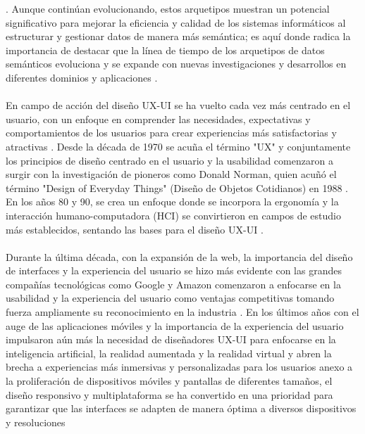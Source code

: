 \documentclass[12pt,a4paper]{article}
\begin{document}
\cite{Sari2012}
\cite{Casey2015}
\cite{Vinoski2007}
. Aunque continúan evolucionando, estos arquetipos muestran un potencial significativo para mejorar la eficiencia y calidad de los sistemas informáticos al estructurar y gestionar datos de manera más semántica; es aquí donde radica la importancia de destacar que la línea de tiempo de los arquetipos de datos semánticos evoluciona y se expande con nuevas investigaciones y desarrollos en diferentes dominios y aplicaciones
\cite{Marco-Ruiz2015a}
\cite{Spath2011}
. 
\\\\
En campo de acción del diseño UX-UI se ha vuelto cada vez más centrado en el usuario, con un enfoque en comprender las necesidades, expectativas y comportamientos de los usuarios para crear experiencias más satisfactorias y atractivas
\cite{Sari2012}
\cite{Govinda2015}
. Desde la década de 1970 se acuña el término "UX" y conjuntamente los principios de diseño centrado en el usuario y la usabilidad comenzaron a surgir con la investigación de pioneros como Donald Norman, quien acuñó el término "Design of Everyday Things" (Diseño de Objetos Cotidianos) en 1988
\cite{Kopanitsa2015}
\cite{Marco-Ruiz2015}
. En los años 80 y 90, se crea un enfoque donde se incorpora la ergonomía y la interacción humano-computadora (HCI) se convirtieron en campos de estudio más establecidos, sentando las bases para el diseño UX-UI
\cite{Epifanio2016}
\cite{Ragozini2017}
. 
\\\\
Durante la última década, con la expansión de la web, la importancia del diseño de interfaces y la experiencia del usuario se hizo más evidente con las grandes compañías tecnológicas como Google y Amazon comenzaron a enfocarse en la usabilidad y la experiencia del usuario como ventajas competitivas tomando fuerza ampliamente su reconocimiento en la industria
\cite{Safina2016}
\cite{Qanbari2016}
\cite{Thiele2016}
\cite{Hassan2016}
. 
En los últimos años con el auge de las aplicaciones móviles y la importancia de la experiencia del usuario impulsaron aún más la necesidad de diseñadores UX-UI para enfocarse en la inteligencia artificial, la realidad aumentada y la realidad virtual y abren la brecha a experiencias más inmersivas y personalizadas para los usuarios anexo a la proliferación de dispositivos móviles y pantallas de diferentes tamaños, el diseño responsivo y multiplataforma se ha convertido en una prioridad para garantizar que las interfaces se adapten de manera óptima a diversos dispositivos y resoluciones
\cite{Gadea2016}
\cite{Pozdniakova2017}
\end{document}
